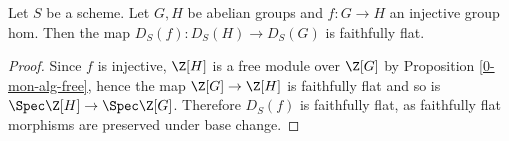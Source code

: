 \begin{proposition}
  \label{0-diag-faithful-flat}

  Let $S$ be a scheme.
  Let $G, H$ be abelian groups and $f : G \to H$ an injective group hom.
  Then the map $D_S(f) : D_S(H) \to D_S(G)$ is faithfully flat.
\end{proposition}
\begin{proof}

  Since $f$ is injective, $\Z[H]$ is a free module over $\Z[G]$ by Proposition \ref{0-mon-alg-free},
  hence the map $\Z[G] \to \Z[H]$ is faithfully flat and so is $\Spec \Z[H] \to \Spec \Z[G]$.
  Therefore $D_S(f)$ is faithfully flat,
  as faithfully flat morphisms are preserved under base change.
\end{proof}
